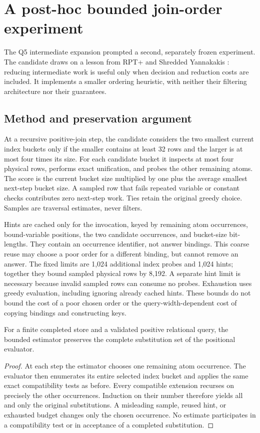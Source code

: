 \section{A post-hoc bounded join-order experiment}
\label{sec:lookahead}
The Q5 intermediate expansion prompted a second, separately frozen experiment.
The candidate draws on a lesson from RPT+ and Shredded Yannakakis
\cite{qiao2026,bekkers2025}: reducing intermediate work is useful only when
decision and reduction costs are included. It implements a smaller ordering
heuristic, with neither their filtering architecture nor their guarantees.

\subsection{Method and preservation argument}
At a recursive positive-join step, the candidate considers the two smallest
current index buckets only if the smaller contains at least 32 rows and the
larger is at most four times its size. For each candidate bucket it inspects
at most four physical rows, performs exact unification, and probes the other
remaining atoms. The score is the current bucket size multiplied by one plus
the average smallest next-step bucket size. A sampled row that fails repeated
variable or constant checks contributes zero next-step work. Ties retain the
original greedy choice. Samples are traversal estimates, never filters.

Hints are cached only for the invocation, keyed by remaining atom occurrences,
bound-variable positions, the two candidate occurrences, and bucket-size
bit-lengths. They contain an occurrence identifier, not answer bindings. This
coarse reuse may choose a poor order for a different binding, but cannot remove
an answer. The fixed limits are 1,024 additional index probes and 1,024 hints;
together they bound sampled physical rows by 8,192. A separate hint limit is
necessary because invalid sampled rows can consume no probes. Exhaustion uses
greedy evaluation, including ignoring already cached hints. These bounds do not
bound the cost of a poor chosen order or the query-width-dependent cost of
copying bindings and constructing keys.

\begin{proposition}
For a finite completed store and a validated positive relational query,
the bounded estimator preserves the complete substitution set of the
positional evaluator.
\end{proposition}
\begin{proof}
At each step the estimator chooses one remaining atom occurrence. The evaluator
then enumerates its entire selected index bucket and applies the same exact
compatibility tests as before. Every compatible extension recurses on precisely
the other occurrences. Induction on their number therefore yields all and only
the original substitutions. A misleading sample, reused hint, or exhausted
budget changes only the chosen occurrence. No estimate participates in a
compatibility test or in acceptance of a completed substitution.
\end{proof}

